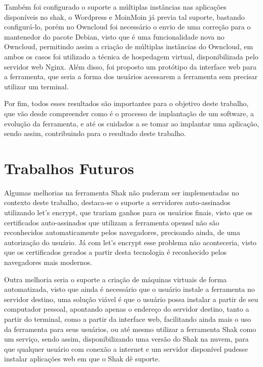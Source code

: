 Também foi configurado o suporte a múltiplas instâncias nas aplicações disponíveis
no shak, o Wordpress e MoinMoin já previa tal suporte, bastando configurá-lo, porém no Owncloud
foi necessário o envio de uma correção para o mantenedor do pacote Debian, visto que
é uma funcionalidade nova no Owncloud, permitindo assim a criação de múltiplas
instâncias do Owncloud, em ambos os casos foi utilizado a técnica de hospedagem
virtual, disponibilizada pelo servidor web Nginx. Além disso, foi proposto um protótipo
da interface web para a ferramenta, que seria a forma dos usuários acessarem a 
ferramenta sem precisar utilizar um terminal.

Por fim, todos esses resultados são importantes para o objetivo deste trabalho, que vão
desde compreender como é o processo de implantação de um software, a evolução
da ferramenta, e até os cuidados
a se tomar ao implantar uma aplicação, sendo assim, contribuindo para o resultado
deste trabalho.

\section{Trabalhos Futuros}
%

Algumas melhorias na ferramenta Shak não puderam ser implementadas  no contexto
deste trabalho, destaca-se o suporte a servidores auto-assinados utilizando
let's encrypt, que trariam ganhos para os usuários finais, visto que os certificados
auto-assinados que utilizam a ferramenta openssl não são reconhecidos automaticamente 
pelos navegadores, precisando ainda, de uma autorização do usuário. Já
com let's encrypt esse problema não aconteceria, visto que os certificados
gerados a partir desta tecnologia é reconhecido pelos navegadores mais modernos.

Outra melhoria seria o suporte a criação de máquinas virtuais de forma automatizada, visto
que ainda é necessário que o usuário instale a ferramenta no servidor destino, uma
solução viável é que o usuário possa instalar a partir de seu computador pessoal,
 apontando apenas o endereço do servidor destino, tanto a partir do terminal, como
a partir da interface web, facilitando ainda mais o uso da ferramenta para seus usuários, ou
até mesmo utilizar a ferramenta Shak como um serviço, sendo assim, disponibilizando uma
versão do Shak na nuvem, para que qualquer usuário com conexão a internet e um servidor
disponível pudesse instalar aplicações web em que o Shak dê suporte.
 
